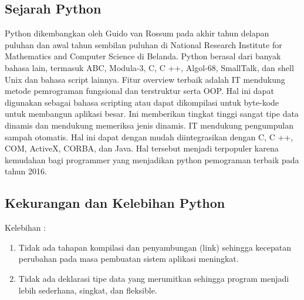 \subsection{Sejarah Python}
Python dikembangkan oleh Guido van Rossum pada akhir tahun delapan puluhan dan awal tahun sembilan puluhan di National Research Institute for Mathematics and Computer Science di Belanda. Python berasal dari banyak bahasa lain, termasuk ABC, Modula-3, C, C ++, Algol-68, SmallTalk, dan shell Unix dan bahasa script lainnya.
Fitur overview terbaik adalah IT mendukung metode pemrograman fungsional dan terstruktur serta OOP. Hal ini dapat digunakan sebagai bahasa scripting atau dapat dikompilasi untuk byte-kode untuk membangun aplikasi besar. Ini memberikan tingkat tinggi sangat tipe data dinamis dan mendukung memeriksa jenis dinamis. IT mendukung pengumpulan sampah otomatis. Hal ini dapat dengan mudah diintegrasikan dengan C, C ++, COM, ActiveX, CORBA, dan Java. Hal tersebut menjadi terpopuler karena kemudahan bagi programmer yang menjadikan python pemograman terbaik pada tahun 2016.

\subsection{Kekurangan dan Kelebihan Python}
Kelebihan :
\begin{enumerate}
\item Tidak ada tahapan kompilasi dan penyambungan (link) sehingga kecepatan perubahan pada masa pembuatan sistem aplikasi meningkat.
\item Tidak ada deklarasi tipe data yang merumitkan sehingga program menjadi lebih sederhana, singkat, dan fleksible.
\end{enumerate}

